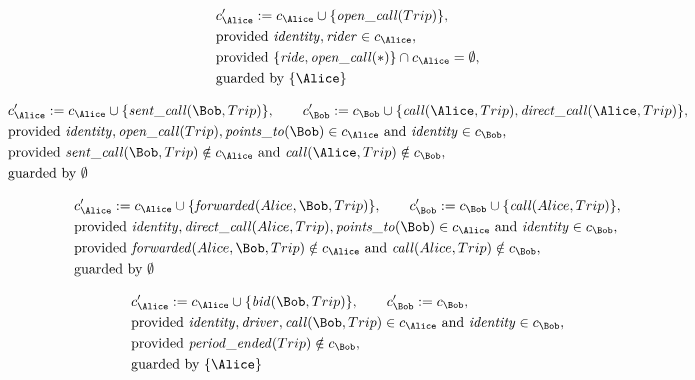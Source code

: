 \begin{align*}
&
c'_
{
\Alice
}
 := 
c_
{
\Alice
}
 \cup 
\{
\mathit{\detokenize{
open_call
}}
(
Trip
)
\}
,\\
&
\text{provided } 
\mathit{\detokenize{
identity
}}
,
\mathit{\detokenize{
rider
}}
 \in c_
{
\Alice
}
,\\
&
\text{provided } 
\{
\mathit{\detokenize{
ride
}}
,
\mathit{\detokenize{
open_call
}}
(
\ast
)
\}
 \cap c_
{
\Alice
}
 = \emptyset
,\\
&
\text{guarded by } \{
\Alice
\}
\end{align*}

\begin{align*}
&
c'_
{
\Alice
}
 := 
c_
{
\Alice
}
 \cup 
\{
\mathit{\detokenize{
sent_call
}}
(
\Bob
,
Trip
)
\}
, \qquad 
c'_
{
\Bob
}
 := 
c_
{
\Bob
}
 \cup 
\{
\mathit{\detokenize{
call
}}
(
\Alice
,
Trip
)
,
\mathit{\detokenize{
direct_call
}}
(
\Alice
,
Trip
)
\}
,\\
&
\text{provided } 
\mathit{\detokenize{
identity
}}
,
\mathit{\detokenize{
open_call
}}
(
Trip
)
,
\mathit{\detokenize{
points_to
}}
(
\Bob
)
 \in c_
{
\Alice
}
 \text{ and } 
\mathit{\detokenize{
identity
}}
 \in c_
{
\Bob
}
,\\
&
\text{provided } 
\mathit{\detokenize{
sent_call
}}
(
\Bob
,
Trip
)
 \notin c_
{
\Alice
}
 \text{ and } 
\mathit{\detokenize{
call
}}
(
\Alice
,
Trip
)
 \notin c_
{
\Bob
}
,\\
&
\text{guarded by } \emptyset
\end{align*}

\begin{align*}
&
c'_
{
\Alice
}
 := 
c_
{
\Alice
}
 \cup 
\{
\mathit{\detokenize{
forwarded
}}
(
Alice
,
\Bob
,
Trip
)
\}
, \qquad 
c'_
{
\Bob
}
 := 
c_
{
\Bob
}
 \cup 
\{
\mathit{\detokenize{
call
}}
(
Alice
,
Trip
)
\}
,\\
&
\text{provided } 
\mathit{\detokenize{
identity
}}
,
\mathit{\detokenize{
direct_call
}}
(
Alice
,
Trip
)
,
\mathit{\detokenize{
points_to
}}
(
\Bob
)
 \in c_
{
\Alice
}
 \text{ and } 
\mathit{\detokenize{
identity
}}
 \in c_
{
\Bob
}
,\\
&
\text{provided } 
\mathit{\detokenize{
forwarded
}}
(
Alice
,
\Bob
,
Trip
)
 \notin c_
{
\Alice
}
 \text{ and } 
\mathit{\detokenize{
call
}}
(
Alice
,
Trip
)
 \notin c_
{
\Bob
}
,\\
&
\text{guarded by } \emptyset
\end{align*}

\begin{align*}
&
c'_
{
\Alice
}
 := 
c_
{
\Alice
}
 \cup 
\{
\mathit{\detokenize{
bid
}}
(
\Bob
,
Trip
)
\}
, \qquad 
c'_
{
\Bob
}
 := 
c_
{
\Bob
}
,\\
&
\text{provided } 
\mathit{\detokenize{
identity
}}
,
\mathit{\detokenize{
driver
}}
,
\mathit{\detokenize{
call
}}
(
\Bob
,
Trip
)
 \in c_
{
\Alice
}
 \text{ and } 
\mathit{\detokenize{
identity
}}
 \in c_
{
\Bob
}
,\\
&
\text{provided } 
\mathit{\detokenize{
period_ended
}}
(
Trip
)
 \notin c_
{
\Bob
}
,\\
&
\text{guarded by } \{
\Alice
\}
\end{align*}
